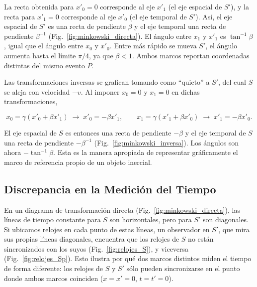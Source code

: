 La recta obtenida para $x'_0=0$ corresponde al eje $x'_1$ (el eje espacial de $S'$), y la recta para $x'_1=0$ corresponde al eje $x'_0$ (el eje temporal de $S'$). Así, el eje espacial de $S'$ es una recta de pendiente $\beta$ y el eje temporal una recta de pendiente $\beta^{-1}$ (Fig.~\ref{fig:minkowski_directa}). El ángulo entre $x_1$ y $x'_1$ es $\tan^{-1}\beta$, igual que el ángulo entre $x_0$ y $x'_0$. Entre más rápido se mueva $S'$, el ángulo aumenta hasta el límite $\pi/4$, ya que $\beta<1$. Ambos marcos reportan coordenadas distintas del mismo evento $P$.



Las transformaciones inversas se grafican tomando como ``quieto'' a $S'$, del cual $S$ se aleja con velocidad $-v$. Al imponer $x_0=0$ y $x_1=0$ en dichas transformaciones,

$$
x_0 = \gamma(x'_0 + \beta x'_1) \;\longrightarrow\; x'_0 = -\beta x'_1 , \qquad
x_1 = \gamma(x'_1 + \beta x'_0) \;\longrightarrow\; x'_1 = -\beta x'_0 .
$$

El eje espacial de $S$ es entonces una recta de pendiente $-\beta$ y el eje temporal de $S$ una recta de pendiente $-\beta^{-1}$ (Fig.~\ref{fig:minkowski_inversa}). Los ángulos son ahora $-\tan^{-1}\beta$. Esta es la manera apropiada de representar gráficamente el marco de referencia propio de un objeto inercial.



\subsection{Discrepancia en la Medición del Tiempo}

En un diagrama de transformación directa (Fig.~\ref{fig:minkowski_directa}), las líneas de tiempo constante para $S$ son horizontales, pero para $S'$ son diagonales. Si ubicamos relojes en cada punto de estas líneas, un observador en $S'$, que mira sus propias líneas diagonales, encuentra que los relojes de $S$ no están sincronizados con los suyos (Fig.~\ref{fig:relojes_S}), y viceversa (Fig.~\ref{fig:relojes_Sp}). Esto ilustra por qué dos marcos distintos miden el tiempo de forma diferente: los relojes de $S$ y $S'$ sólo pueden sincronizarse en el punto donde ambos marcos coinciden ($x=x'=0$, $t=t'=0$).





